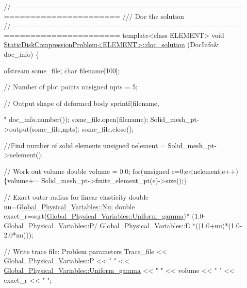 \begin{DoxyCodeInclude}


\textcolor{comment}{//==================================================================}\textcolor{comment}{}
\textcolor{comment}{/// Doc the solution}
\textcolor{comment}{}\textcolor{comment}{//==================================================================}
\textcolor{keyword}{template}<\textcolor{keyword}{class} ELEMENT>
\textcolor{keywordtype}{void} \hyperlink{classStaticDiskCompressionProblem_a9154152d022e86461966b5562f5acba4}{StaticDiskCompressionProblem<ELEMENT>::doc\_solution}
      (DocInfo& doc\_info)
\{

 ofstream some\_file;
 \textcolor{keywordtype}{char} filename[100];

 \textcolor{comment}{// Number of plot points}
 \textcolor{keywordtype}{unsigned} npts = 5; 

 \textcolor{comment}{// Output shape of deformed body}
 sprintf(filename,\textcolor{stringliteral}{"%
         doc\_info.number());
 some\_file.open(filename);
 Solid\_mesh\_pt->output(some\_file,npts);
 some\_file.close();

 \textcolor{comment}{//Find number of solid elements}
 \textcolor{keywordtype}{unsigned} nelement = Solid\_mesh\_pt->nelement();

 \textcolor{comment}{// Work out volume}
 \textcolor{keywordtype}{double} volume = 0.0;
 \textcolor{keywordflow}{for}(\textcolor{keywordtype}{unsigned} e=0;e<nelement;e++) 
  \{volume+= Solid\_mesh\_pt->finite\_element\_pt(e)->size();\}
 
 \textcolor{comment}{// Exact outer radius for linear elasticity}
 \textcolor{keywordtype}{double} nu=\hyperlink{namespaceGlobal__Physical__Variables_a3962c36313826b19f216f6bbbdd6a477}{Global\_Physical\_Variables::Nu};
 \textcolor{keywordtype}{double} exact\_r=sqrt(\hyperlink{namespaceGlobal__Physical__Variables_ae02b5f5b098b05fba75f3b61f381c5f7}{Global\_Physical\_Variables::Uniform\_gamma})*
  (1.0-\hyperlink{namespaceGlobal__Physical__Variables_a23c2ade6398f54040b869f7f3a2bcc4b}{Global\_Physical\_Variables::P}/
      \hyperlink{namespaceGlobal__Physical__Variables_a09a019474b7405b35da2437f7779bc7e}{Global\_Physical\_Variables::E}
   *((1.0+nu)*(1.0-2.0*nu)));


 \textcolor{comment}{// Write trace file: Problem parameters}
 Trace\_file << \hyperlink{namespaceGlobal__Physical__Variables_a23c2ade6398f54040b869f7f3a2bcc4b}{Global\_Physical\_Variables::P}  << \textcolor{stringliteral}{" "} 
            << \hyperlink{namespaceGlobal__Physical__Variables_ae02b5f5b098b05fba75f3b61f381c5f7}{Global\_Physical\_Variables::Uniform\_gamma} << \textcolor{stringliteral}{" "} 
            << volume << \textcolor{stringliteral}{" "} 
            << exact\_r << \textcolor{stringliteral}{" "};
   
}
\end{DoxyCodeInclude}
